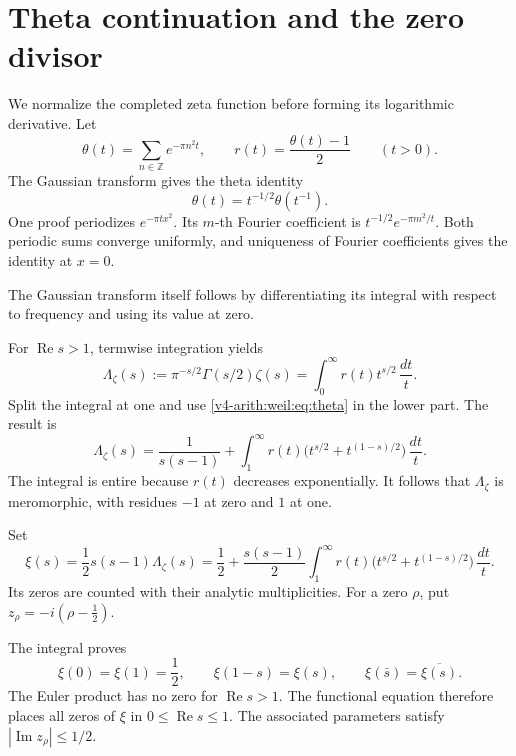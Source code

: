 \section{Theta continuation and the zero divisor}
\label{v4-arith:weil:theta}

We normalize the completed zeta function before forming its logarithmic
derivative. Let
\[
 \theta(t)=\sum_{n\in\mathbb Z}e^{-\pi n^2t},\qquad
 r(t)=\frac{\theta(t)-1}{2}\qquad(t>0).
\]
The Gaussian transform gives the theta identity
\begin{equation}
 \theta(t)=t^{-1/2}\theta(t^{-1}).
 \label{v4-arith:weil:eq:theta}
\end{equation}
One proof periodizes \(e^{-\pi t x^2}\). Its \(m\)-th Fourier coefficient
is \(t^{-1/2}e^{-\pi m^2/t}\). Both periodic sums converge uniformly,
and uniqueness of Fourier coefficients gives the identity at \(x=0\).

The Gaussian transform itself follows by differentiating its integral
with respect to frequency and using its value at zero.

For \(\operatorname{Re}s>1\), termwise integration yields
\[
 \Lambda_\zeta(s):=\pi^{-s/2}\Gamma(s/2)\zeta(s)
             =\int_0^\infty r(t)t^{s/2}\,\frac{dt}{t}.
\]
Split the integral at one and use \eqref{v4-arith:weil:eq:theta}
in the lower part. The result is
\begin{equation}
 \Lambda_\zeta(s)=\frac1{s(s-1)}
    +\int_1^\infty r(t)
            \bigl(t^{s/2}+t^{(1-s)/2}\bigr)\,\frac{dt}{t}.
 \label{v4-arith:weil:eq:completed}
\end{equation}
The integral is entire because \(r(t)\) decreases exponentially.
It follows that \(\Lambda_\zeta\) is meromorphic, with residues
\(-1\) at zero and \(1\) at one.

\begin{definition}
\label{v4-arith:weil:def:xi}
Set
\begin{equation}
 \xi(s)=\frac12s(s-1)\Lambda_\zeta(s)
 =\frac12+\frac{s(s-1)}2
    \int_1^\infty r(t)
          \bigl(t^{s/2}+t^{(1-s)/2}\bigr)\,\frac{dt}{t}.
 \label{v4-arith:weil:eq:xi}
\end{equation}
Its zeros are counted with their analytic multiplicities.
For a zero \(\rho\), put \(z_\rho=-i(\rho-\tfrac12)\).
\end{definition}

The integral proves
\[
 \xi(0)=\xi(1)=\frac12,\qquad
 \xi(1-s)=\xi(s),\qquad
 \xi(\bar s)=\overline{\xi(s)}.
\]
The Euler product has no zero for \(\operatorname{Re}s>1\).
The functional equation therefore places all zeros of \(\xi\) in
\(0\le\operatorname{Re}s\le1\). The associated parameters satisfy
\(|\operatorname{Im}z_\rho|\le1/2\).

